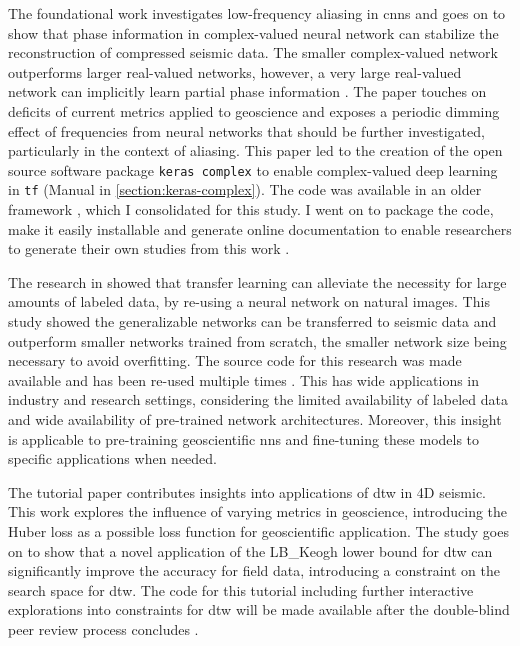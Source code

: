 The foundational work investigates low-frequency aliasing in \aclp{cnn} and goes on to show that phase information in complex-valued neural network can stabilize the reconstruction of compressed seismic data. The smaller complex-valued network outperforms larger real-valued networks, however, a very large real-valued network can implicitly learn partial phase information \citep{dramsch2019complex}. The paper touches on deficits of current metrics applied to geoscience and exposes a periodic dimming effect of frequencies from neural networks that should be further investigated, particularly in the context of aliasing. This paper led to the creation of the open source software package \texttt{keras complex} to enable complex-valued deep learning in \texttt{\acl{tf}} (Manual in \ref{section:keras-complex}). The code was available in an older framework \citep{trabelsi2017deep}, which I consolidated for this study. I went on to package the code, make it easily installable and generate online documentation to enable researchers to generate their own studies from this work \citep{dramsch2019complexcode}.

The research in \citet{dramsch2018deep} showed that transfer learning can alleviate the necessity for large amounts of labeled data, by re-using a neural network on natural images. This study showed the generalizable networks can be transferred to seismic data and outperform smaller networks trained from scratch, the smaller network size being necessary to avoid overfitting. The source code for this research was made available and has been re-used multiple times \citep{dramsch2018deepcode}. This has wide applications in industry and research settings, considering the limited availability of labeled data and wide availability of pre-trained network architectures. Moreover, this insight is applicable to pre-training geoscientific \aclp{nn} and fine-tuning these models to specific applications when needed.

The tutorial paper \citep{dramsch2019dtw} contributes insights into applications of \acl{dtw} in 4D seismic. This work explores the influence of varying metrics in geoscience, introducing the Huber loss as a possible loss function for geoscientific application. The study goes on to show that a novel application of the LB\_Keogh lower bound for \acl{dtw} can significantly improve the accuracy for field data, introducing a constraint on the search space for \ac{dtw}. The code for this tutorial including further interactive explorations into constraints for \acl{dtw} will be made available after the double-blind peer review process concludes \citep{dramsch2020dtwcode}.

